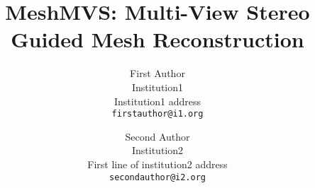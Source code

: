 \documentclass[10pt,twocolumn,letterpaper]{article}
\newcommand{\siyu}[1]{\textcolor{myRed}{{[Siyu: #1]}}}
\begin{document}
\title{MeshMVS: Multi-View Stereo Guided Mesh Reconstruction}

\author{First Author\\
Institution1\\
Institution1 address\\
{\tt\small firstauthor@i1.org}
\and
Second Author\\
Institution2\\
First line of institution2 address\\
{\tt\small secondauthor@i2.org}
}

\maketitle
\ificcvfinal\thispagestyle{empty}\fi

\newcommand{\todo}[1]{{\textcolor{red}{\bf [#1]}}}

\newcommand{\figref}[1]{Figure~\ref{fig:#1}}
\newcommand{\tabref}[1]{Table~\ref{tab:#1}}
\newcommand{\equref}[1]{Equation~(\ref{equ:#1})}
\newcommand{\secref}[1]{Section~\ref{sec:#1}}
\newcommand{\subsecref}[1]{Sub-section~\ref{subsec:#1}}
\newcommand{\tableref}[1]{Table~\ref{table:#1}}








{\small


}
\end{document}
